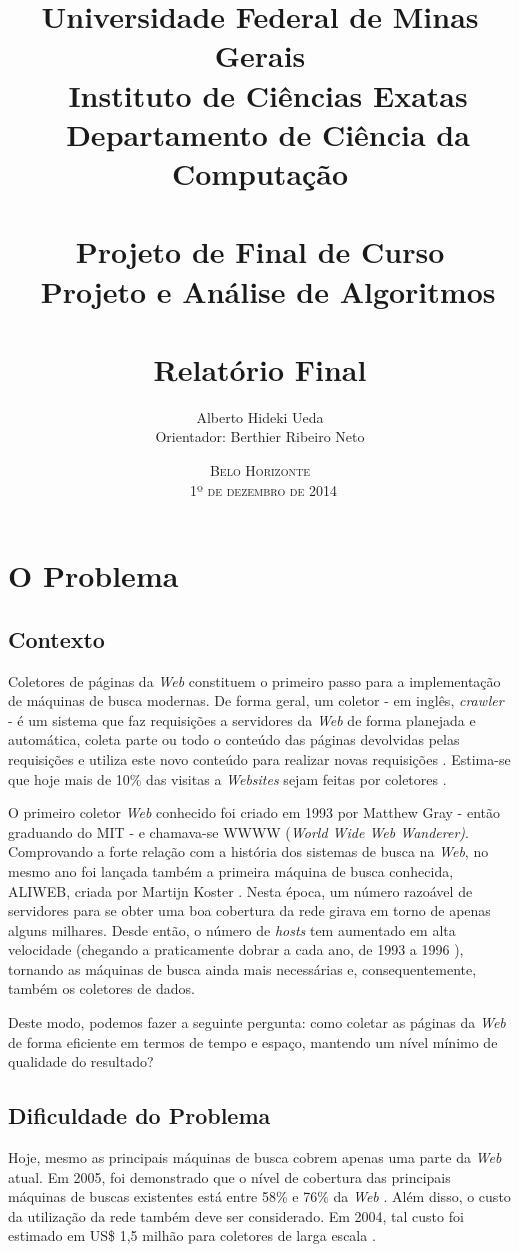 \documentclass[a4paper,12pt,titlepage]{article}
\title{\large
Universidade Federal de Minas Gerais \\ \
Instituto de Ciências Exatas \\ \ 
Departamento de Ciência da Computação \\ \
\\[1cm]
Projeto de Final de Curso\\ \
Projeto e Análise de Algoritmos\\ \
\\[1cm]
\textbf{\Large Relatório Final }
\\[1cm]
}
\author{\large Alberto Hideki Ueda \\[0.5cm] 
	Orientador: Berthier Ribeiro Neto 
\\[3cm] }
\date{\textsc{Belo Horizonte\\ \
1º de dezembro de 2014}}
\begin{document}
\maketitle

\pagebreak
\tableofcontents
\pagebreak

\section {O Problema}

\subsection{Contexto}

Coletores de páginas da \textit{Web} constituem o primeiro passo para a implementação de máquinas de busca modernas. De forma geral, um coletor - em inglês, \textit{crawler} - é um sistema que faz requisições a servidores da \textit{Web} de forma planejada e automática, coleta parte ou todo o conteúdo das páginas devolvidas pelas requisições e utiliza este novo conteúdo para realizar novas requisições \cite{b}. Estima-se que hoje mais de 10\% das visitas a \textit{Websites} sejam feitas por coletores \cite{nielsen}.

O primeiro coletor \textit{Web} conhecido foi criado em 1993 por Matthew Gray - então graduando do MIT - e chamava-se WWWW (\textit{World Wide Web Wanderer)}. Comprovando a forte relação com a história dos sistemas de busca na \textit{Web}, no mesmo ano foi lançada também a primeira máquina de busca conhecida, ALIWEB, criada por Martijn Koster \cite{b}. Nesta época, um número razoável de servidores para se obter uma boa cobertura da rede girava em torno de apenas alguns milhares. Desde então, o número de \textit{hosts} tem aumentado em alta velocidade  (chegando a praticamente dobrar a cada ano, de 1993 a 1996 \cite{gray}), tornando as máquinas de busca ainda mais necessárias e, consequentemente, também os coletores de dados.

Deste modo, podemos fazer a seguinte pergunta: como coletar as páginas da \textit{Web} de forma eficiente em termos de tempo e espaço, mantendo um nível mínimo de qualidade do resultado?

\subsection{Dificuldade do Problema}

Hoje, mesmo as principais máquinas de busca cobrem apenas uma parte da \textit{Web} atual. Em 2005, foi demonstrado que o nível de cobertura das principais máquinas de buscas existentes está entre 58\% e 76\% da \textit{Web} \cite{gulli}. Além disso, o custo da utilização da rede também deve ser considerado. Em 2004, tal custo foi estimado em US\$ 1,5 milhão para coletores de larga escala \cite{craswell}. 
\end{document}
